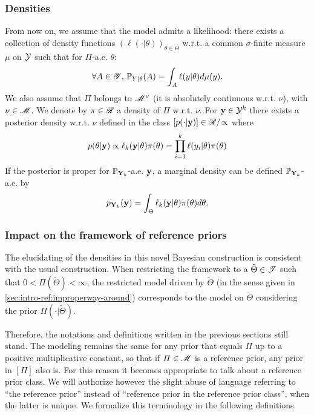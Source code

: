 \subsubsection{Densities}

From now on, we assume that the model admits a likelihood: there exists a collection of density functions $(\ell(\cdot|\theta))_{\theta\in\Theta}$  w.r.t. a common  $\sigma$-finite measure $\mu$ on $\mathcal{Y}$ such that for $\varPi$-a.e. $\theta$:
\begin{equation}
    \forall A\in\mathscr{Y},\,\mathbb{P}_{Y|\theta}(A) = \int_A\ell(y|\theta)d\mu(y).
\end{equation}
We also assume that $\varPi$ belongs to $\mathscr{M}^\nu$ (it is absolutely continuous w.r.t. $\nu$), with $\nu\in\mathscr{M}$. We denote by $\pi\in\mathscr{R}$ a density of $\varPi$ w.r.t. $\nu$.
For $\mathbf{y}\in\mathcal{Y}^k$ there exists a posterior density w.r.t. $\nu$ defined in  the class $[p(\cdot|\mathbf{y})]\in\mathscr{R}/\!\propto$ where
    \begin{equation}
        p(\theta|\mathbf{y}) 
        \propto  \ell_k(\mathbf{y}|\theta)\pi(\theta) = \prod_{i=1}^k\ell(y_i|\theta)\pi(\theta)
    \end{equation}
If the posterior is proper for $\mathbb{P}_{\mathbf{Y}_k}$-a.e. $\mathbf{y}$, a marginal density can be defined $\mathbb{P}_{\mathbf{Y}_k}$-a.e. by
    \begin{equation}
        p_{\mathbf{Y}_k}(\mathbf{y}) =  \int_\Theta\ell_k(\mathbf{y}|\theta)\pi(\theta)d\theta.
    \end{equation}


\subsubsection{Impact on the framework of reference priors}

The elucidating of the densities in this novel Bayesian construction is consistent with the usual construction.
When restricting the framework to a $\tilde\Theta\in\mathscr{T}$ such that $0<\varPi(\tilde\Theta)<\infty$, the restricted model driven by $\tilde\Theta$ (in the sense given in \cref{sec:intro-ref:improperway-around})  corresponds to the model on $\tilde\Theta$ considering the prior $\varPi(\cdot|\tilde\Theta)$.

Therefore, the notations and definitions written in the previous sections still stand.
The modeling remains the same for any prior that equals  $\varPi$ up to a positive multiplicative constant, so that if $\varPi\in\mathscr{M}$ is a reference prior, any prior in $[\varPi]$ also is.
For this reason it becomes appropriate to talk about a reference prior class. 
We will authorize however the slight abuse of language referring to ``the reference prior'' instead of ``reference prior in the reference prior class'', when the latter is unique.
We formalize this terminology in the following definitions.


